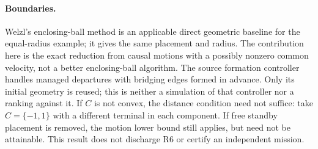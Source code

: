 \documentclass[11pt]{article}
\begin{document}
\paragraph{Boundaries.}
Welzl's enclosing-ball method is an applicable direct geometric
baseline for the equal-radius example; it gives the same placement and
radius. The contribution here is the exact reduction from causal motions
with a possibly nonzero common velocity, not a better enclosing-ball
algorithm. The source formation controller handles managed departures
with bridging edges formed in advance. Only its initial geometry is
reused; this is neither a simulation of that controller nor a ranking
against it. If \(C\) is not convex, the distance condition need not
suffice: take \(C=\{-1,1\}\) with a different terminal in each component.
If free standby placement is removed, the motion lower bound still
applies, but need not be attainable. This result does not discharge R6
or certify an independent mission.
\end{document}
